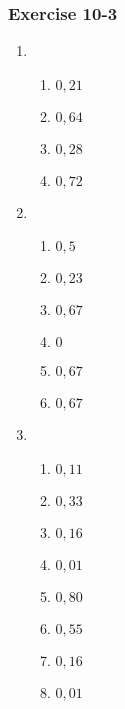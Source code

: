 {\begin{multicols}{3}
\subsubsection*{Exercise 10-3} %

\begin{enumerate}[noitemsep, label=\textbf{\arabic*}. ] 
\item %

    \begin{enumerate}[noitemsep, label=\textbf{(\alph*)} ]
	  \item $0,21$%
	  \item $0,64$%
	  \item $0,28$%
	  \item $0,72$%
    \end{enumerate}

\item %


      \begin{enumerate}[noitemsep, label=\textbf{(\alph*)} ]
	  \item $0,5$%
	  \item $0,23$%
	  \item $0,67$%
	  \item $0$%
	  \item $0,67$%
	  \item $0,67$%
      \end{enumerate}
\item
      \begin{enumerate}[noitemsep, label=\textbf{(\alph*)} ]
	  \item $0,11$%
	  \item $0,33$%
	  \item $0,16$%
	  \item $0,01$%
	  \item $0,80$%
	  \item $0,55$%
	  \item $0,16$%
	  \item $0,01$%
      \end{enumerate}


\end{enumerate}
\end{multicols}}
